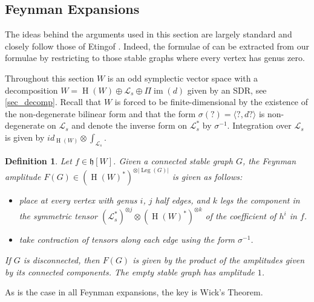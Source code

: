 \documentclass[]{amsart}
\newtheorem{definition}[theorem]{Definition}
\theoremstyle{definition}
\newcommand{\im}{\operatorname{im}}
\newcommand{\homology}{\operatorname{H}}
\begin{document}
\subsection{Feynman Expansions}

The ideas behind the arguments used in this section are largely standard and closely follow those of Etingof \cite{etingof}. Indeed, the formulae of \cite{etingof} can be extracted from our formulae by restricting to those stable graphs where every vertex has genus zero.

Throughout this section $W$ is an odd symplectic vector space with a decomposition $W=\homology (W) \oplus \mathcal{L}_s \oplus \Pi \im(d)$ given by an SDR, see \ref{sec_decomp}. Recall that $W$ is forced to be finite-dimensional by the existence of the non-degenerate bilinear form and that the form $\sigma (?)=\langle ?,d? \rangle$ is non-degenerate on $\mathcal{L}_s$ and denote the inverse form on $\mathcal{L}_s^*$ by $\sigma^{-1}$. Integration over $\mathcal{L}_s$ is given by $id_{\homology (W)} \otimes \int_{\mathcal{L}_s}$.

\begin{definition}
Let $f\in\mathfrak{h}[W]$. Given a  connected stable graph $G$, the Feynman amplitude $F(G)\in (\homology(W)^*)^{\otimes \lvert \operatorname{Leg}(G) \rvert}$ is given as follows:
\begin{itemize}
\item place at every vertex with genus $i$, $j$ half edges, and $k$ legs the component in the symmetric tensor $(\mathcal{L}_s^*)^{\otimes j}\otimes (\homology(W)^*)^{\otimes k}$ of the coefficient of $h^i$ in $f$.
\item take contraction of tensors along each edge using the form $\sigma^{-1}$.
\end{itemize}
If $G$ is disconnected, then $F(G)$ is given by the product of the amplitudes given by its connected components. The empty stable graph has amplitude $1$.
\end{definition}

As is the case in all Feynman expansions, the key is Wick's Theorem.
\end{document}
